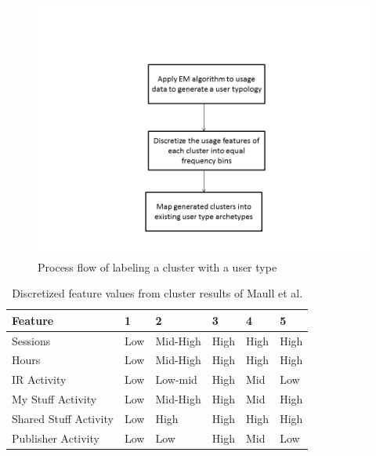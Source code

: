 \documentclass{acm_proc_article-sp}
\begin{document}
\begin{figure}
\centering
\includegraphics[width=1 \linewidth]{./process_flow}
\caption{Process flow of labeling a cluster with a user type}
\label{fig:process_flow}
\end{figure}

\begin{table}
\caption{Discretized feature values from cluster results of Maull et al. \cite{maullunderstanding}}
\label{maull_features}
\begin{tabular}{|l|l|l|l|l|l|} \\ \hline
\textbf{Feature} & 1 & 2 & 3 & 4 & 5 \\ \hline
Sessions & Low & Mid-High & High & High & High \\ \hline
Hours & Low & Mid-High & High & High & High \\ \hline
IR Activity & Low & Low-mid & High & Mid & Low \\ \hline
My Stuff Activity & Low & Mid-High & High & Mid & High \\ \hline
Shared Stuff Activity & Low & High & High & High & High \\ \hline
Publisher Activity & Low & Low & High & Mid & Low \\ \hline
\end{tabular}
\end{table}
\end{document}
